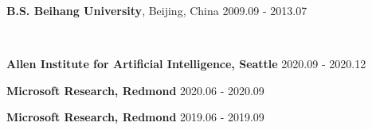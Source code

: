 \documentclass[11pt, a4paper]{article}
\begin{document}
\textbf{B.S. Beihang University}, Beijing, China \hfill 2009.09 - 2013.07
	
\

\textbf{Allen Institute for Artificial Intelligence, Seattle} \hfill 2020.09 - 2020.12

\textbf{Microsoft Research, Redmond} \hfill 2020.06 - 2020.09
	
\textbf{Microsoft Research, Redmond} \hfill 2019.06 - 2019.09
	



\end{document}
